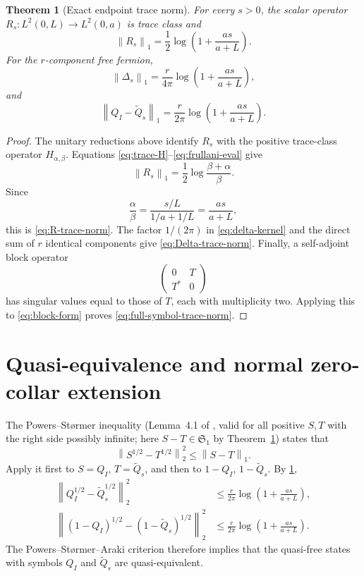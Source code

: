 \documentclass[11pt]{article}
\theoremstyle{accent}
\newtheorem{theorem}{Theorem}[section]
\theoremstyle{definition}
\newcommand{\Sone}{\mathfrak{S}_1}
\newcommand{\norm}[1]{\left\lVert #1\right\rVert}
\begin{document}
\begin{theorem}[Exact endpoint trace norm]\label{thm:trace-norm}
For every \(s>0\), the scalar operator \(R_s:L^2(0,L)\to L^2(0,a)\) is trace class and
\begin{equation}\label{eq:R-trace-norm}
 \boxed{
 \norm{R_s}_1
 =\frac12\log\!\left(1+\frac{as}{a+L}\right).
 }
\end{equation}
For the \(r\)-component free fermion,
\begin{equation}\label{eq:Delta-trace-norm}
 \boxed{
 \norm{\Delta_s}_1
 =\frac{r}{4\pi}\log\!\left(1+\frac{as}{a+L}\right),
 }
\end{equation}
and
\begin{equation}\label{eq:full-symbol-trace-norm}
 \boxed{
 \norm{Q_I-\widetilde Q_s}_1
 =\frac{r}{2\pi}\log\!\left(1+\frac{as}{a+L}\right).
 }
\end{equation}
\end{theorem}

\begin{proof}
The unitary reductions above identify \(R_s\) with the positive trace-class operator \(H_{\alpha,\beta}\).  Equations \eqref{eq:trace-H}--\eqref{eq:frullani-eval} give
\[
 \norm{R_s}_1
 =\frac12\log\frac{\beta+\alpha}{\beta}.
\]
Since
\[
 \frac{\alpha}{\beta}
 =\frac{s/L}{1/a+1/L}
 =\frac{as}{a+L},
\]
this is \eqref{eq:R-trace-norm}.  The factor \(1/(2\pi)\) in \eqref{eq:delta-kernel} and the direct sum of \(r\) identical components give \eqref{eq:Delta-trace-norm}.  Finally, a self-adjoint block operator
\[
 \begin{pmatrix}0&T\\T^*&0\end{pmatrix}
\]
has singular values equal to those of \(T\), each with multiplicity two.  Applying this to \eqref{eq:block-form} proves \eqref{eq:full-symbol-trace-norm}.
\end{proof}

\section{Quasi-equivalence and normal zero-collar extension}

The Powers--St\o rmer inequality (Lemma~4.1 of \cite{PowersStormer}, valid for all positive \(S,T\) with the right side possibly infinite; here \(S-T\in\Sone\) by Theorem~\ref{thm:trace-norm}) states that
\begin{equation}\label{eq:powers-stormer}
 \norm{S^{1/2}-T^{1/2}}_2^2\le\norm{S-T}_1.
\end{equation}
Apply it first to \(S=Q_I\), \(T=\widetilde Q_s\), and then to \(1-Q_I\), \(1-\widetilde Q_s\).  By \cref{thm:trace-norm},
\begin{align}
 \norm{Q_I^{1/2}-\widetilde Q_s^{1/2}}_2^2
 &\le\frac{r}{2\pi}\log\!\left(1+\frac{as}{a+L}\right),
 \label{eq:PS-1}\\
 \norm{(1-Q_I)^{1/2}-(1-\widetilde Q_s)^{1/2}}_2^2
 &\le\frac{r}{2\pi}\log\!\left(1+\frac{as}{a+L}\right).
 \label{eq:PS-2}
\end{align}
The Powers--St\o rmer--Araki criterion therefore implies that the quasi-free states with symbols \(Q_I\) and \(\widetilde Q_s\) are quasi-equivalent.
\end{document}
